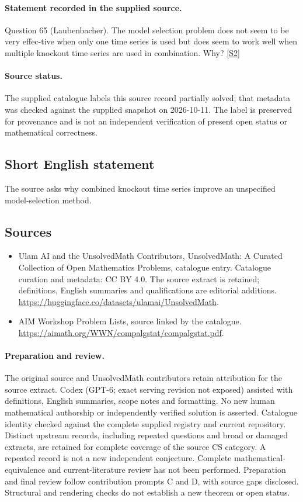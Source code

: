 \documentclass[11pt]{article}
\begin{document}
\paragraph{Statement recorded in the supplied source.}
Question 65 (Laubenbacher). The model selection problem does not seem to be very effec-tive when only one time series is used but does seem to work well when multiple knockout time series are used in combination. Why? \href{https://aimath.org/WWN/compalgstat/compalgstat.pdf}{[S2]}
\paragraph{Source status.}
The supplied catalogue labels this source record partially solved; that metadata was checked against the supplied snapshot on 2026-10-11. The label is preserved for provenance and is not an independent verification of present open status or mathematical correctness.
\subsection{Short English statement}
The source asks why combined knockout time series improve an unspecified model-selection method.
\subsection{Sources}
\begin{itemize}
\item[S1] Ulam AI and the UnsolvedMath Contributors, UnsolvedMath: A Curated Collection of Open Mathematics Problems, catalogue entry. Catalogue curation and metadata: CC BY 4.0. The source extract is retained; definitions, English summaries and qualifications are editorial additions.
\url{https://huggingface.co/datasets/ulamai/UnsolvedMath}.
\item[S2] AIM Workshop Problem Lists, source linked by the catalogue.
\url{https://aimath.org/WWN/compalgstat/compalgstat.pdf}.
\end{itemize}
\paragraph{Preparation and review.}
The original source and UnsolvedMath contributors retain attribution for the source extract. Codex (GPT-6; exact serving revision not exposed) assisted with definitions, English summaries, scope notes and formatting. No new human mathematical authorship or independently verified solution is asserted. Catalogue identity checked against the complete supplied registry and current repository. Distinct upstream records, including repeated questions and broad or damaged extracts, are retained for complete coverage of the source CS category. A repeated record is not a new independent conjecture. Complete mathematical-equivalence and current-literature review has not been performed. Preparation and final review follow contribution prompts C and D, with source gaps disclosed. Structural and rendering checks do not establish a new theorem or open status.
\label{end:statement}
\end{document}
